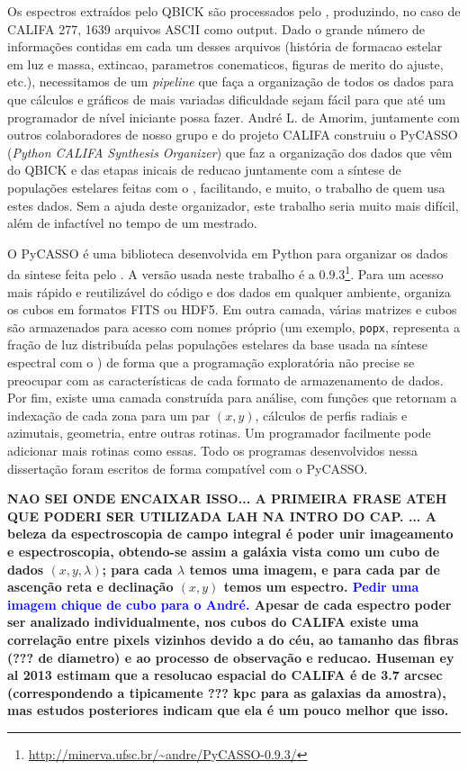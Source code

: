 Os espectros extraídos pelo QBICK são processados pelo \starlight, produzindo, no caso de CALIFA 277, 1639 arquivos
ASCII como output. Dado o grande número de informações contidas em cada um desses arquivos (história de formacao estelar
em luz e massa, extincao, parametros conematicos, figuras de merito do ajuste, etc.), necessitamos de um {\em pipeline}
que faça a organização de todos os dados para que cálculos e gráficos de mais variadas dificuldade sejam fácil para que
até um programador de nível iniciante possa fazer. André L. de Amorim, juntamente com outros colaboradores de nosso
grupo e do projeto CALIFA construiu o PyCASSO ({\em Python CALIFA \starlight Synthesis Organizer}) \citep[][ cap.
4]{CidFernandes2013I} que faz a organização dos dados que vêm do QBICK e das etapas inicais de reducao juntamente com a
síntese de populações estelares feitas com o \starlight, facilitando, e muito, o trabalho de quem usa estes dados. Sem a
ajuda deste organizador, este trabalho seria muito mais difícil, além de infactível no tempo de um mestrado.

O PyCASSO é uma biblioteca desenvolvida em Python para organizar os dados da sintese feita pelo \starlight. A versão
usada neste trabalho é a $0.9.3$\footnote{\url{http://minerva.ufsc.br/~andre/PyCASSO-0.9.3/}}. Para um acesso mais
rápido e reutilizável do código e dos dados em qualquer ambiente, organiza os cubos em formatos FITS ou HDF5. Em outra
camada, várias matrizes e cubos são armazenados para acesso com nomes próprio (um exemplo, \texttt{popx}, representa a
fração de luz distribuída pelas populações estelares da base usada na síntese espectral com o \starlight) de forma que a
programação exploratória não precise se preocupar com as características de cada formato de armazenamento de dados. Por
fim, existe uma camada construída para análise, com funções que retornam a indexação de cada zona para um par $(x, y)$,
cálculos de perfis radiais e azimutais, geometria, entre outras rotinas. Um programador facilmente pode adicionar mais
rotinas como essas. Todo os programas desenvolvidos nessa dissertação foram escritos de forma compatível com o PyCASSO.

{\bf \ojo NAO SEI ONDE ENCAIXAR ISSO...  A PRIMEIRA FRASE ATEH QUE PODERI SER UTILIZADA LAH NA INTRO DO CAP. ...
A beleza da espectroscopia de campo integral é poder unir imageamento e espectroscopia, obtendo-se assim a galáxia vista
como um cubo de dados  $(x, y, \lambda)$; para cada $\lambda$ temos uma imagem, e para cada par de ascenção reta e
declinação $(x, y)$ temos um espectro. \ojo \textcolor{blue}{Pedir uma imagem chique de cubo para o André.} Apesar de
cada espectro poder ser analizado individualmente, nos cubos do CALIFA existe uma correlação entre pixels vizinhos
devido a  do céu, ao tamanho das fibras (??? de diametro) e ao processo de observação e reducao.
Huseman ey al 2013 estimam que a resolucao espacial do CALIFA é de 3.7 arcsec (correspondendo a tipicamente ??? kpc para
as galaxias da amostra), mas estudos posteriores indicam que ela é um pouco melhor que isso.}


